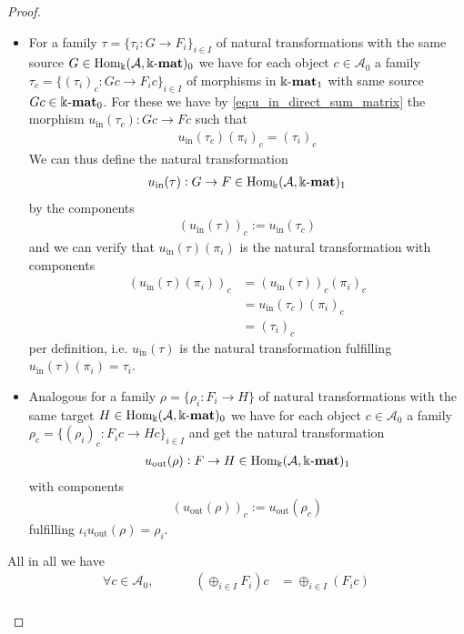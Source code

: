 \begin{proof}
\begin{enumerate}
\begin{subproof}[Proof of (ii)]
\begin{itemize}
\item For a family $\tau = \{ \tau_{i} : G \rightarrow F_{i} \}_{i \in I}$ of natural transformations with the same source
$G \in \mathrm{Hom_{\Bbbk}}(\mathcal{A},\Bbbk\textnormal{-}\mathbf{mat})_{0}$ we have for each object $c \in \mathcal{A}_{0}$ a family
$\tau_{c} = \{ (\tau_{i})_{c} : Gc \rightarrow F_{i}c \}_{i \in I}$ of morphisms in $\Bbbk\textnormal{-}\mathbf{mat}_{1}$ with same source $Gc \in \Bbbk\textnormal{-}\mathbf{mat}_{0}$.
For these we have by \eqref{eq:u_in_direct_sum_matrix} the morphism $u_{\text{in}}(\tau_{c}) : Gc \rightarrow Fc$ such that
\begin{align*}
u_{\text{in}}(\tau_{c}) (\pi_{i})_{c} =
(\tau_{i})_{c}
\end{align*}
We can thus define the natural transformation
\begin{align*}
u_{\text{in}}(\tau) : G \rightarrow F \in \mathrm{Hom_{\Bbbk}}(\mathcal{A},\Bbbk\textnormal{-}\mathbf{mat})_{1}
\end{align*}
by the components
\begin{align*}
(u_{\text{in}}(\tau))_{c} := u_{\text{in}}(\tau_{c})
\end{align*}
and we can verify that $u_{\text{in}}(\tau) (\pi_{i})$ is the natural transformation with components
\begin{align*}
(u_{\text{in}}(\tau) (\pi_{i}))_{c} &= (u_{\text{in}}(\tau))_{c} (\pi_{i})_{c} \\
&= u_{\text{in}}(\tau_{c}) (\pi_{i})_{c} \\
&= (\tau_{i})_{c}
\end{align*}
per definition, i.e. $u_{\text{in}}(\tau)$ is the natural transformation fulfilling $u_{\text{in}}(\tau) (\pi_{i}) = \tau_{i}$.
\item Analogous for a family $\rho = \{ \rho_{i} : F_{i} \rightarrow H \}$ of natural transformations with the same target
$H \in \mathrm{Hom_{\Bbbk}}(\mathcal{A},\Bbbk\textnormal{-}\mathbf{mat})_{0}$ we have for each object $c \in \mathcal{A}_{0}$ a family
$\rho_{c} = \{ (\rho_{i})_{c} : F_{i} c \rightarrow Hc \}_{i \in I}$ and get the
natural transformation
\begin{align*}
u_{\text{out}}(\rho) : F \rightarrow H \in \mathrm{Hom_{\Bbbk}}(\mathcal{A},\Bbbk\textnormal{-}\mathbf{mat})_{1}
\end{align*}
with components
\begin{align*}
(u_{\text{out}}(\rho))_{c} := u_{\text{out}}(\rho_{c})
\end{align*}
fulfilling $\iota_{i} u_{\text{out}}(\rho) = \rho_{i}$.
\end{itemize}
All in all we have 
\begin{align*}
\forall c \in \mathcal{A}_{0},&& &&  (\oplus_{i \in I} F_{i}) c &= \oplus_{i \in I} (F_{i} c) \\

\end{align*}
\end{subproof}
\end{enumerate}
\end{proof}
